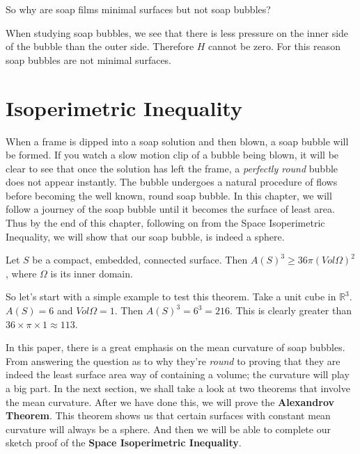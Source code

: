 \documentclass[a4paper,12pt]{report}
\begin{document}
\hspace{-0.66cm}So why are soap films minimal surfaces but not soap bubbles? \newline

When studying soap bubbles, we see that there is less pressure on the inner side of the bubble than the outer side. Therefore $H$ cannot be zero. For this reason soap bubbles are not minimal surfaces.\newline

\chapter{Isoperimetric Inequality}

When a frame is dipped into a soap solution and then blown, a soap bubble will be formed.  If you watch a slow motion clip of a bubble being blown, it will be clear to see that once the solution has left the frame, a \textit{perfectly round} bubble does not appear instantly.
The bubble undergoes a natural procedure of flows before becoming the well known, round soap bubble. In this chapter, we will follow a journey of the soap bubble until it becomes the surface of least area. Thus by the end of this chapter, following on from the Space Isoperimetric Inequality, we will show that our soap bubble, is indeed a sphere.

\begin{theorem}
Let $S$ be a compact, embedded, connected surface. Then $A(S)^{3} \geq 36\pi(Vol\Omega)^{2}$, where $\Omega$ is its inner domain.
\end{theorem}

\hspace{-0.66cm}So let's start with a simple example to test this theorem. Take a unit cube in $\mathbb{R}^{3}$. $A(S) = 6$ and $Vol\Omega = 1$. Then $A(S)^{3} = 6^{3} = 216$. This is clearly greater than $36 \times \pi \times 1 \approx 113$.\newline

\hspace{-0.66cm}In this paper, there is a great emphasis on the mean curvature of soap bubbles. From answering the question as to why they're \textit{round} to proving that they are indeed the least surface area way of containing a volume; the curvature will play a big part. In the next section, we shall take a look at two theorems that involve the mean curvature. After we have done this, we will prove the \textbf{Alexandrov Theorem}. This theorem shows us that certain surfaces with constant mean curvature will always be a sphere. And then we will be able to complete our sketch proof of the \textbf{Space Isoperimetric Inequality}.
\end{document}
